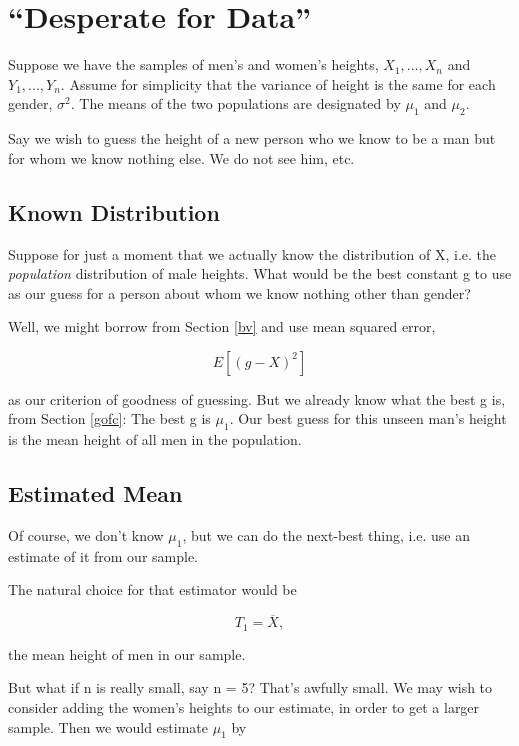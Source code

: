 \section{``Desperate for Data''}
\label{dfd}

Suppose we have the samples of men's and women's heights, $X_1,...,X_n$
and $Y_1,...,Y_n$.  Assume for simplicity that the variance of height is
the same for each gender, $\sigma^2$.  The means of the two populations
are designated by $\mu_1$ and $\mu_2$.

Say we wish to guess the height of a new person who we know to be a man
but for whom we know nothing else.  We do not see him, etc.

\subsection{Known Distribution}
\label{known}

Suppose for just a moment that we actually know the distribution of X,
i.e. the {\it population} distribution of male heights.  What would be
the best constant g to use as our guess for a person about whom we know
nothing other than gender?

Well, we might borrow from Section \ref{bv} and use mean squared error, 

\begin{equation}
E[(g-X)^2]
\end{equation}

as our criterion of goodness of guessing.  But we already know what the
best g is, from Section \ref{gofc}:  The best g is $\mu_1$.  Our best
guess for this unseen man's height is the mean height of all men in the
population.

\subsection{Estimated Mean}

Of course, we don't know $\mu_1$, but we can do the next-best thing,
i.e. use an estimate of it from our sample.

The natural choice for that estimator would be

\begin{equation}
T_1 = \overline{X},
\end{equation}

the mean height of men in our sample.

But what if n is really small, say n = 5?  That's awfully small.  We may
wish to consider adding the women's heights to our estimate, in order to
get a larger sample.  Then we would estimate $\mu_1$ by

